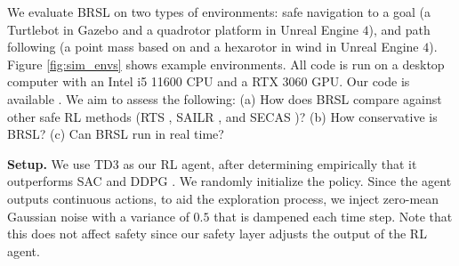 We evaluate BRSL on two types of environments: safe navigation to a goal (a Turtlebot in Gazebo and a quadrotor platform in Unreal Engine $4$), and path following (a point mass based on \cite{achiam2017constrained,wagener2021safe} and a hexarotor in wind in Unreal Engine $4$).
Figure \ref{fig:sim_envs} shows example environments.
All code is run on a desktop computer with an Intel i5 11600 CPU and a RTX 3060 GPU. 
Our code is available \href{https://github.com/Mahmoud-Selim/Safe-Reinforcement-Learning-for-Black-Box-Systems-Using-Reachability-Analysis}{\underline{\color{blue}{online}}}.
We aim to assess the following:
(a) How does BRSL compare against other safe RL methods (RTS \cite{conf:modelBasedReachRL}, SAILR \cite{wagener2021safe}, and SECAS \cite{dalal2018safe})?
(b) How conservative is BRSL?
(c) Can BRSL run in real time?

\textbf{Setup.}
We use TD3 \cite{conf:TD3} as our RL agent, after determining empirically that it outperforms SAC \cite{conf:SAC} and DDPG \cite{conf:DDPG}. %
We randomly initialize the policy.
Since the agent outputs continuous actions, to aid the exploration process, we inject zero-mean Gaussian noise with a variance of $0.5$ that is dampened each time step.
Note that this does not affect safety since our safety layer adjusts the output of the RL agent.

